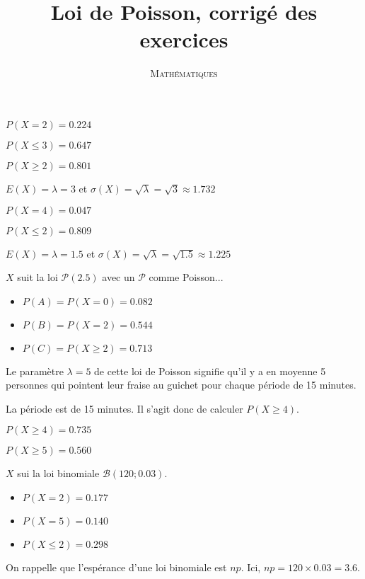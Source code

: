\documentclass[a4paper,12pt]{scrartcl}
\date{}
\title{Loi de Poisson, corrigé des exercices}
\author{\textsc{Mathématiques}}
\begin{document}
\maketitle

\exo{}

\question{}
$P(X=2) = 0.224$

\question{}
$P(X \leqslant 3) = 0.647$

\question{}
$P(X\geqslant 2) = 0.801$

\question{}
$E(X) = \lambda = 3$ et $\sigma(X) = \sqrt{\lambda} = \sqrt{3} \approx 1.732$


\exo{}

\question{}
$P(X = 4) = 0.047$

\question{}
$P(X \leqslant 2) = 0.809$

\question{}
$E(X) = \lambda = 1.5$ et $\sigma(X) = \sqrt{\lambda} = \sqrt{1.5} \approx 1.225$


\exo{}

$X$ suit la loi $\mathcal{P}(2.5)$ avec un $\mathcal{P}$ comme Poisson... 

\begin{itemize}
 \item $P(A) = P(X=0) = 0.082$
 \item $P(B) = P(X=2) = 0.544$
 \item $P(C) = P(X \geqslant 2) = 0.713$
\end{itemize}

\exo{}

\question{}
Le paramètre $\lambda = 5$ de cette loi de Poisson signifie qu'il y a en moyenne 5 personnes qui pointent leur fraise au guichet pour chaque période de 15 minutes. 

\question{}
La période est de 15 minutes. Il s'agit donc de calculer $P(X \geqslant 4)$.

$P(X\geqslant 4) = 0.735$

\question{}
$P(X\geqslant 5) = 0.560$


\exo{}

\question{}
$X$ sui la loi binomiale $\mathcal{B}(120;0.03)$.

\begin{itemize}
 \item $P(X = 2) = 0.177$
 \item $P(X = 5) = 0.140$
 \item $P(X \leqslant 2) = 0.298$
\end{itemize}

\question{}
On rappelle que l'espérance d'une loi binomiale est $np$. Ici, $np = 120 \times 0.03 = 3.6$. 
\end{document}
